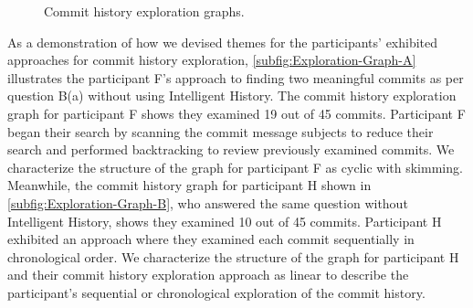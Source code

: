\begin{figure}[h]
  \centering%
  \qquad
  \caption{
    Commit history exploration graphs.
  }%
  \label{fig:Exploration-Graphs}%
\end{figure}

As a demonstration of how we devised themes for the participants' exhibited approaches for commit history exploration, \autoref{subfig:Exploration-Graph-A} illustrates the participant F's approach to finding two meaningful commits as per question B(a) without using Intelligent History.
The commit history exploration graph for participant F shows they examined 19 out of 45 commits.
Participant F began their search by scanning the commit message subjects to reduce their search and performed backtracking to review previously examined commits.
We characterize the structure of the graph for participant F as cyclic with skimming.
Meanwhile, the commit history graph for participant H shown in \autoref{subfig:Exploration-Graph-B}, who answered the same question without Intelligent History, shows they examined 10 out of 45 commits.
Participant H exhibited an approach where they examined each commit sequentially in chronological order.
We characterize the structure of the graph for participant H and their commit history exploration approach as linear to describe the participant's sequential or chronological exploration of the commit history.

